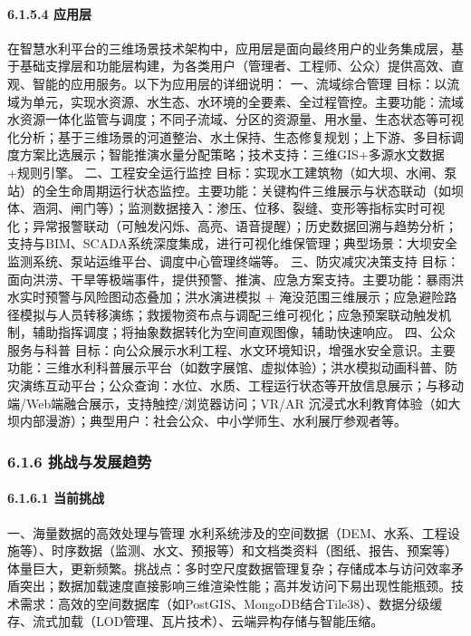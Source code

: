 {\paragraph{6.1.5.4 应用层}\label{ux5e94ux7528ux5c42}
在智慧水利平台的三维场景技术架构中，应用层是面向最终用户的业务集成层，基于基础支撑层和功能层构建，为各类用户（管理者、工程师、公众）提供高效、直观、智能的应用服务。以下为应用层的详细说明： 一、流域综合管理
目标：以流域为单元，实现水资源、水生态、水环境的全要素、全过程管控。主要功能：流域水资源一体化监管与调度；不同子流域、分区的资源量、用水量、生态状态等可视化分析；基于三维场景的河道整治、水土保持、生态修复规划；上下游、多目标调度方案比选展示；智能推演水量分配策略；技术支持：三维GIS+多源水文数据+规则引擎。
二、工程安全运行监控
目标：实现水工建筑物（如大坝、水闸、泵站）的全生命周期运行状态监控。主要功能：关键构件三维展示与状态联动（如坝体、涵洞、闸门等）；监测数据接入：渗压、位移、裂缝、变形等指标实时可视化；异常报警联动（可触发闪烁、高亮、语音提醒）；历史数据回溯与趋势分析；支持与BIM、SCADA系统深度集成，进行可视化维保管理；典型场景：大坝安全监测系统、泵站运维平台、调度中心管理终端等。
三、防灾减灾决策支持 目标：面向洪涝、干旱等极端事件，提供预警、推演、应急方案支持。主要功能：暴雨洪水实时预警与风险图动态叠加；洪水演进模拟 +
淹没范围三维展示；应急避险路径模拟与人员转移演练；救援物资布点与调配三维可视化；应急预案联动触发机制，辅助指挥调度；将抽象数据转化为空间直观图像，辅助快速响应。 四、公众服务与科普
目标：向公众展示水利工程、水文环境知识，增强水安全意识。主要功能：三维水利科普展示平台（如数字展馆、虚拟体验）；洪水模拟动画科普、防灾演练互动平台；公众查询：水位、水质、工程运行状态等开放信息展示；与移动端/Web端融合展示，支持触控/浏览器访问；VR/AR
沉浸式水利教育体验（如大坝内部漫游）；典型用户：社会公众、中小学师生、水利展厅参观者等。 \subsubsection{6.1.6
挑战与发展趋势}\label{ux6311ux6218ux4e0eux53d1ux5c55ux8d8bux52bf} \paragraph{6.1.6.1 当前挑战}\label{ux5f53ux524dux6311ux6218}
一、海量数据的高效处理与管理
水利系统涉及的空间数据（DEM、水系、工程设施等）、时序数据（监测、水文、预报等）和文档类资料（图纸、报告、预案等）体量巨大，更新频繁。挑战点：多时空尺度数据管理复杂；存储成本与访问效率矛盾突出；数据加载速度直接影响三维渲染性能；高并发访问下易出现性能瓶颈。技术需求：高效的空间数据库（如PostGIS、MongoDB结合Tile38）、数据分级缓存、流式加载（LOD管理、瓦片技术）、云端异构存储与智能压缩。
}
